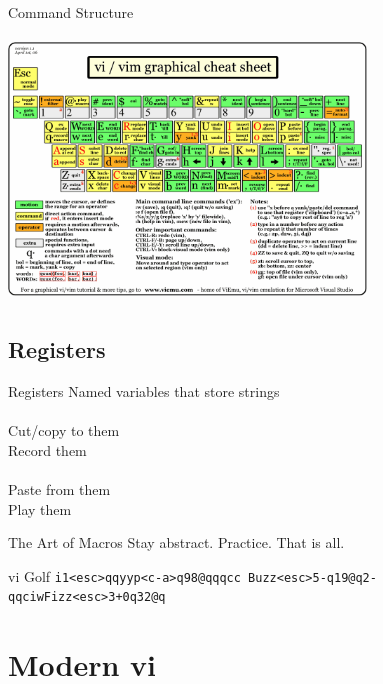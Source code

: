 \documentclass{beamer}
\begin{document}
            \begin{frame}{Command Structure}
                \begin{center}
                \includegraphics[width = 9.5cm, height = 7cm]{images/vi_vim_cheat_sheet.png}
                \end{center}
            \end{frame}

        \subsection{Registers}

            \begin{frame}{Registers}
                Named variables that store strings \\~\\
                Cut/copy to them \\
                Record them \\~\\
                Paste from them \\
                Play them
            \end{frame}

            \begin{frame}{The Art of Macros}
                Stay abstract. \pause Practice. \pause That is all.
            \end{frame}

            \begin{frame}{vi Golf}
                \texttt{i1<esc>qqyyp<c-a>q98@qqqcc Buzz<esc>5-q19@q2-qqciwFizz<esc>3+0q32@q}
            \end{frame}

    \section{Modern vi}
\end{document}
